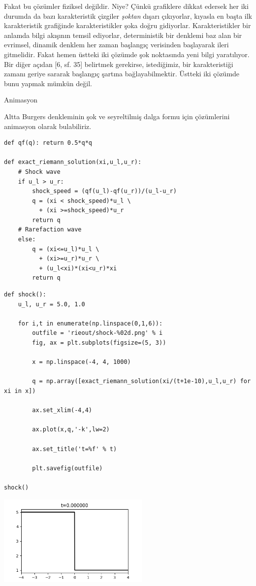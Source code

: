 \documentclass[12pt,fleqn]{article}\usepackage{../../common}
\begin{document}
Fakat bu çözümler fiziksel değildir. Niye? Çünkü grafiklere dikkat edersek
her iki durumda da bazı karakteristik çizgiler {\em şoktan} dışarı çıkıyorlar,
kıyasla en başta ilk karakteristik grafiğinde karakteristikler şoka doğru
gidiyorlar. Karakteristikler bir anlamda bilgi akışının temsil ediyorlar,
deterministik bir denklemi baz alan bir evrimsel, dinamik denklem her zaman
başlangıç verisinden başlayarak ileri gitmelidir. Fakat hemen üstteki iki
çözümde şok noktasında yeni bilgi yaratılıyor. Bir diğer açıdan [6, sf. 35]
belirtmek gerekirse, istediğimiz, bir karakteristiği zamanı geriye sararak
başlangıç şartına bağlayabilmektir. Üstteki iki çözümde bunu yapmak mümkün değil. 

Animasyon

Altta Burgers denkleminin şok ve seyreltilmiş dalga formu için çözümlerini
animasyon olarak bulabiliriz.

\begin{verbatim}
def qf(q): return 0.5*q*q
    
def exact_riemann_solution(xi,u_l,u_r):
    # Shock wave
    if u_l > u_r: 
        shock_speed = (qf(u_l)-qf(u_r))/(u_l-u_r)
        q = (xi < shock_speed)*u_l \
          + (xi >=shock_speed)*u_r
        return q
    # Rarefaction wave
    else:  
        q = (xi<=u_l)*u_l \
          + (xi>=u_r)*u_r \
          + (u_l<xi)*(xi<u_r)*xi
        return q
\end{verbatim}

\begin{verbatim}
def shock():
    u_l, u_r = 5.0, 1.0

    for i,t in enumerate(np.linspace(0,1,6)):
        outfile = 'rieout/shock-%02d.png' % i
        fig, ax = plt.subplots(figsize=(5, 3))
                    
        x = np.linspace(-4, 4, 1000)
        
        q = np.array([exact_riemann_solution(xi/(t+1e-10),u_l,u_r) for xi in x])

        ax.set_xlim(-4,4)

        ax.plot(x,q,'-k',lw=2)

        ax.set_title('t=%f' % t)
    
        plt.savefig(outfile)

shock() 
\end{verbatim}


\includegraphics[width=20em]{rieout/shock-00.png}
\end{document}
